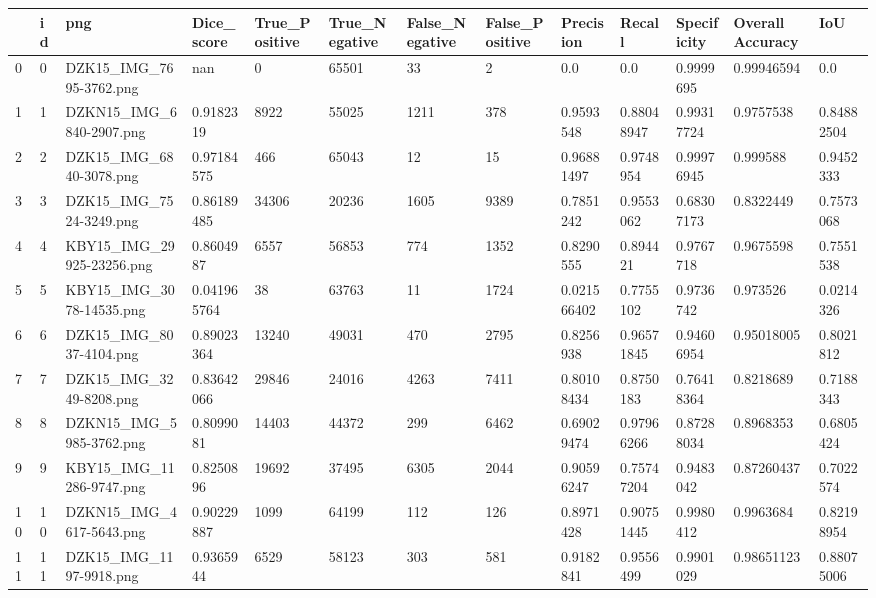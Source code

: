 \documentclass[11pt, a4paper, twoside]{report}
\begin{document}
\begin{longtable}[c]{@{}lllllllllllll@{}}
\toprule
 & id & png & Dice\_score & True\_Positive & True\_Negative & False\_Negative & False\_Positive & Precision & Recall & Specificity & Overall Accuracy & IoU \\* \midrule
\endhead
%
\bottomrule
\endfoot
%
\endlastfoot
%
0 & 0 & DZK15\_IMG\_7695-3762.png & nan & 0 & 65501 & 33 & 2 & 0.0 & 0.0 & 0.9999695 & 0.99946594 & 0.0 \\
1 & 1 & DZKN15\_IMG\_6840-2907.png & 0.9182319 & 8922 & 55025 & 1211 & 378 & 0.9593548 & 0.88048947 & 0.99317724 & 0.9757538 & 0.84882504 \\
2 & 2 & DZK15\_IMG\_6840-3078.png & 0.97184575 & 466 & 65043 & 12 & 15 & 0.96881497 & 0.9748954 & 0.99976945 & 0.999588 & 0.9452333 \\
3 & 3 & DZK15\_IMG\_7524-3249.png & 0.86189485 & 34306 & 20236 & 1605 & 9389 & 0.7851242 & 0.9553062 & 0.68307173 & 0.8322449 & 0.7573068 \\
4 & 4 & KBY15\_IMG\_29925-23256.png & 0.8604987 & 6557 & 56853 & 774 & 1352 & 0.8290555 & 0.894421 & 0.9767718 & 0.9675598 & 0.7551538 \\
5 & 5 & KBY15\_IMG\_3078-14535.png & 0.041965764 & 38 & 63763 & 11 & 1724 & 0.021566402 & 0.7755102 & 0.9736742 & 0.973526 & 0.0214326 \\
6 & 6 & DZK15\_IMG\_8037-4104.png & 0.89023364 & 13240 & 49031 & 470 & 2795 & 0.8256938 & 0.96571845 & 0.94606954 & 0.95018005 & 0.8021812 \\
7 & 7 & DZK15\_IMG\_3249-8208.png & 0.83642066 & 29846 & 24016 & 4263 & 7411 & 0.80108434 & 0.8750183 & 0.76418364 & 0.8218689 & 0.7188343 \\
8 & 8 & DZKN15\_IMG\_5985-3762.png & 0.8099081 & 14403 & 44372 & 299 & 6462 & 0.69029474 & 0.97966266 & 0.87288034 & 0.8968353 & 0.6805424 \\
9 & 9 & KBY15\_IMG\_11286-9747.png & 0.8250896 & 19692 & 37495 & 6305 & 2044 & 0.90596247 & 0.75747204 & 0.9483042 & 0.87260437 & 0.7022574 \\
10 & 10 & DZKN15\_IMG\_4617-5643.png & 0.90229887 & 1099 & 64199 & 112 & 126 & 0.8971428 & 0.90751445 & 0.9980412 & 0.9963684 & 0.82198954 \\
11 & 11 & DZK15\_IMG\_1197-9918.png & 0.9365944 & 6529 & 58123 & 303 & 581 & 0.9182841 & 0.9556499 & 0.9901029 & 0.98651123 & 0.88075006 \\

\end{longtable}
\end{document}
